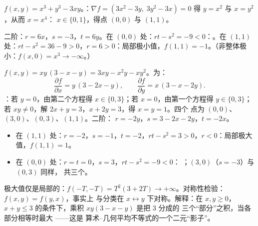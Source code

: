 \begin{example}\label{ex:b1:multivar:extrema}
$f(x,y) = x^3 + y^3 - 3xy$。：$\nabla f = (3x^2 -
3y,\; 3y^2 - 3x) = 0$ 得 $y = x^2$ 与 $x = y^2$，从而 $x = x^4$：
$x \in \{0, 1\}$，得点 $(0,0)$ 与 $(1,1)$。

二阶：$r = 6x$，$s = -3$，$t = 6y$。在 $(0,0)$ 处：$rt -
s^2 = -9 < 0$：。在 $(1,1)$ 处：$rt - s^2 = 36 - 9 > 0$，$r = 6
> 0$：局部极小值，$f(1,1) = -1$。（非整体极小：$f(x, 0) = x^3 \to
-\infty$。）
\end{example}

\begin{example}[四点的完整研究]
\label{ex:b1:multivar:fourpoints}
$f(x, y) = xy\,(3 - x - y) = 3xy - x^2y - xy^2$。为：
\[
\frac{\partial f}{\partial x} = y\,(3 - 2x - y),
\qquad
\frac{\partial f}{\partial y} = x\,(3 - x - 2y).
\]
：若 $y = 0$，由第二个方程得 $x \in
\{0, 3\}$；若 $x = 0$，由第一个方程得 $y \in \{0, 3\}$；若 $xy
\neq 0$，解 $2x + y = 3$，$x + 2y = 3$，得 $x = y = 1$。四个
点为 $(0,0)$、$(3,0)$、$(0,3)$、$(1,1)$。二阶：
$r = -2y$，$s = 3 - 2x - 2y$，$t = -2x$。
\begin{itemize}
  \item 在 $(1,1)$ 处：$r = -2$，$s = -1$，$t = -2$，$rt - s^2 = 3 >
        0$，$r < 0$：局部极大值，$f(1,1) = 1$。
  \item 在 $(0,0)$ 处：$r = t = 0$，$s = 3$，$rt - s^2 = -9 < 0$：
        ；$(3, 0)$（$s = -3$）与 $(0, 3)$ 同样，
        共三个。
\end{itemize}
极大值仅是局部的：$f(-T, -T) = T^2(3 + 2T) \to
+\infty$。对称性检验：$f(x, y) = f(y, x)$，事实上
与分类在 $x
\leftrightarrow y$ 下对称。解释：在 $x, y \geq 0$，$x + y \leq 3$
的条件下，乘积 $xy(3 - x - y)$ 是把 $3$ 分成的
三个“部分”之积，当各部分相等时最大
——这是 算术–几何平均不等式的一个二元“影子”。
\end{example}


